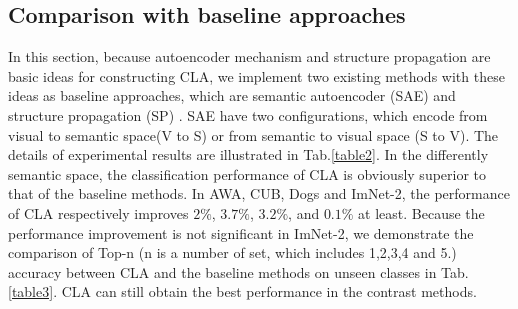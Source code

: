 \documentclass[review]{elsarticle}
\begin{document}
\subsection{Comparison with baseline approaches}
In this section, because autoencoder mechanism and structure propagation are basic ideas for constructing CLA, we implement two existing methods with these ideas as baseline approaches, which are  semantic autoencoder (SAE)\cite{Kodirov2017} and structure propagation (SP) \cite{Lin2018structure}. SAE have two configurations, which encode from visual to semantic space(V to S) or from semantic to visual space (S to V). The details of experimental results are illustrated in Tab.\ref{table2}. In the differently semantic space, the classification performance of CLA is obviously superior to that of the baseline methods. In AWA, CUB, Dogs and ImNet-2, the performance of CLA respectively improves $2\%$, $3.7\%$, $3.2\%$, and $0.1\%$ at least. Because the performance improvement is not significant in ImNet-2, we demonstrate the comparison of Top-n (n is a number of set, which includes 1,2,3,4 and 5.) accuracy between CLA and the baseline methods on unseen classes in Tab.\ref{table3}. CLA can still obtain the best performance in the contrast methods.
\end{document}
